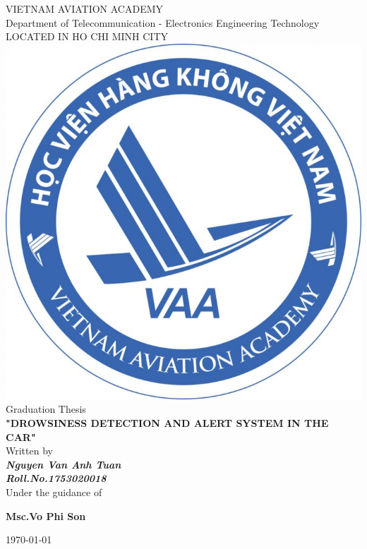 \documentclass[a4paper,13pt]{report}
\begin{document}
    \newpage
    \thispagestyle{plain}
        \centering
        \LARGE{\textsc{VIETNAM AVIATION ACADEMY}}\\
        \vspace{3mm}
        \normalsize{Department of Telecommunication - Electronics Engineering Technology} \\
        \vspace{3mm}
        \large{LOCATED IN HO CHI MINH CITY} \\
        \vspace{3mm}
        \includegraphics[scale=0.3]{img/logo.png} \\
        \vspace{3mm}
        \large{Graduation Thesis} \\
        \vspace{15mm}
        \huge{\textbf{"DROWSINESS DETECTION AND ALERT SYSTEM IN THE CAR"}} \\ 
        \vspace{20mm}
        \normalsize{Written by} \\ 
        \vspace{3mm}
        \large{\textbf{\textit{Nguyen Van Anh Tuan}}} \\ 
        \vspace{3mm}
        \large{\textbf{\textit{Roll.No.1753020018}}} \\ 
        \vspace{15mm}
        \large{Under the guidance of} \\
        \vspace{7mm}
        \centerline{\textbf{\large{Msc.Vo Phi Son}}} 
        \vspace{3cm}
        \centerline{\today}
    
\end{document}
